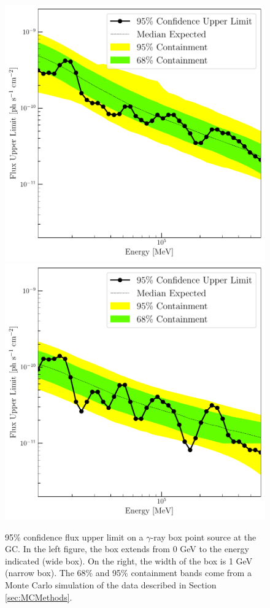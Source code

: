 \begin{figure}[ht] 
\begin{center}
\includegraphics[width=0.45\columnwidth]{figures/brazil_wide_box.pdf}
\includegraphics[width=0.45\columnwidth]{figures/brazil_narrow_box.pdf}
\noindent
\caption{ 
\label{fig:brazil_lines}
95\% confidence flux upper limit on a $\gamma$-ray box point source at the GC. In the left figure, the box extends from 0 GeV to the energy indicated (wide box). On the right, the width of the box is 1 GeV (narrow box). The 68\% and 95\% containment bands come from a Monte Carlo simulation of the data described in Section \ref{sec:MCMethods}. \label{fig:brazil_narrow_box}
}
\end{center}
\end{figure}



